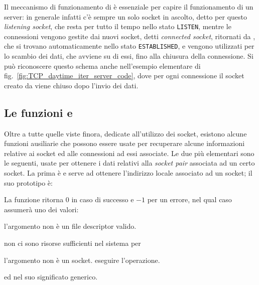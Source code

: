 Il meccanismo di funzionamento di  è essenziale per capire il
funzionamento di un server: in generale infatti c'è sempre un solo socket in
ascolto, detto per questo \textit{listening socket}, che resta per tutto il
tempo nello stato \texttt{LISTEN}, mentre le connessioni vengono gestite dai
nuovi socket, detti \textit{connected socket}, ritornati da , che
si trovano automaticamente nello stato \texttt{ESTABLISHED}, e vengono
utilizzati per lo scambio dei dati, che avviene su di essi, fino alla chiusura
della connessione.  Si può riconoscere questo schema anche nell'esempio
elementare di fig.~\ref{fig:TCP_daytime_iter_server_code}, dove per ogni
connessione il socket creato da  viene chiuso dopo l'invio dei
dati.


\subsection{Le funzioni  e }
\label{sec:TCP_get_names}

Oltre a tutte quelle viste finora, dedicate all'utilizzo dei socket, esistono
alcune funzioni ausiliarie che possono essere usate per recuperare alcune
informazioni relative ai socket ed alle connessioni ad essi associate. Le due
più elementari sono le seguenti, usate per ottenere i dati relativi alla
\textit{socket pair} associata ad un certo socket.  La prima è
 e serve ad ottenere l'indirizzo locale associato ad un
socket; il suo prototipo è:

\begin{funcproto}{
}

{La funzione ritorna $0$ in caso di successo e $-1$ per un errore, nel qual
  caso  assumerà uno dei valori: 
  \begin{errlist}
  \item[\errcode{EBADF}] l'argomento  non è un file descriptor
    valido.
  \item[\errcode{ENOBUFS}] non ci sono risorse sufficienti nel sistema per
  \item[\errcode{ENOTSOCK}] l'argomento  non è un socket.
    eseguire l'operazione.
  \end{errlist}
  ed  nel suo significato generico.}
\end{funcproto}

